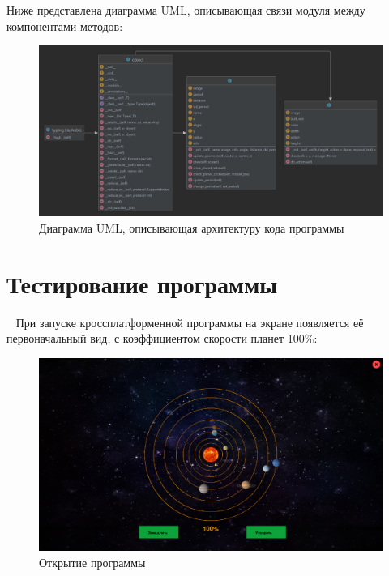 \documentclass[14pt, oneside]{altsu-report}
\begin{document}
Ниже представлена диаграмма UML, описывающая связи модуля между компонентами методов:
\begin{figure}[h]
    \centering
    \includegraphics[width=0.8\linewidth]{src/SolarSystem.png}
    \caption{Диаграмма UML, описывающая архитектуру кода программы}
    \label{fig:my_UML}
\end{figure}

\section{Тестирование программы}~\label{test}
При запуске кроссплатформенной программы на экране появляется её первоначальный вид, с коэффициентом скорости планет 100\%:
\begin{figure}[H]
    \centering
    \includegraphics[width=0.8\linewidth]{src/test/Открытие.png}
    \caption{Открытие программы}
    \label{fig:open}
\end{figure}
\end{document}
